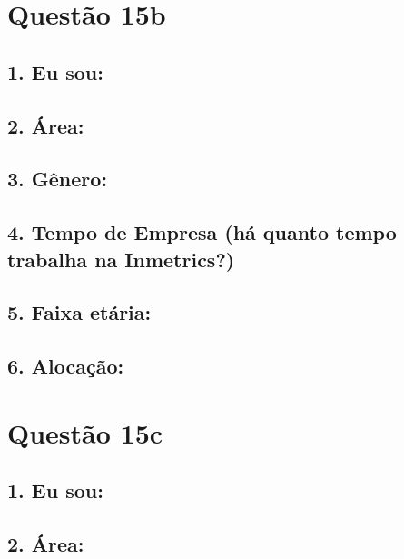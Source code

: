 \documentclass[]{book}
\begin{document}
\hypertarget{questao-15b}{%
\section{Questão 15b}\label{questao-15b}}

\hypertarget{eu-sou-24}{%
\subsection{1. Eu sou:}\label{eu-sou-24}}

\hypertarget{area-24}{%
\subsection{2. Área:}\label{area-24}}

\hypertarget{genero-24}{%
\subsection{3. Gênero:}\label{genero-24}}

\hypertarget{tempo-de-empresa-ha-quanto-tempo-trabalha-na-inmetrics-24}{%
\subsection{4. Tempo de Empresa (há quanto tempo trabalha na Inmetrics?)}\label{tempo-de-empresa-ha-quanto-tempo-trabalha-na-inmetrics-24}}

\hypertarget{faixa-etaria-24}{%
\subsection{5. Faixa etária:}\label{faixa-etaria-24}}

\hypertarget{alocacao-24}{%
\subsection{6. Alocação:}\label{alocacao-24}}

\hypertarget{questao-15c}{%
\section{Questão 15c}\label{questao-15c}}

\hypertarget{eu-sou-25}{%
\subsection{1. Eu sou:}\label{eu-sou-25}}

\hypertarget{area-25}{%
\subsection{2. Área:}\label{area-25}}
\end{document}

